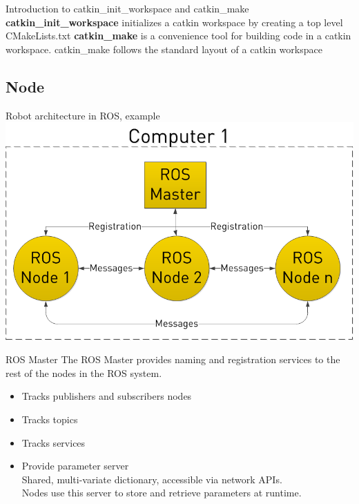 \documentclass{beamer}
\begin{document}
\begin{frame}{Introduction to catkin\_init\_workspace and catkin\_make}
\textbf{catkin\_init\_workspace} initializes a catkin workspace by creating a top level CMakeLists.txt
\vfill
\textbf{catkin\_make} is a convenience tool for building code in a catkin workspace. catkin\_make follows the standard layout of a catkin workspace
\end{frame}

\subsection{Node}
\begin{frame}{Robot architecture in ROS, example}
\includegraphics[scale=0.35]{images/ros}
\end{frame}

\begin{frame}{ROS Master}
The ROS Master provides naming and registration services to the rest of the nodes in the ROS system.

\begin{itemize}
\item Tracks publishers and subscribers nodes
\item Tracks topics
\item Tracks services
\item Provide parameter server\\
Shared, multi-variate dictionary, accessible via network APIs.\\
Nodes use this server to store and retrieve parameters at runtime.\\
\end{itemize}
\end{frame}
\end{document}
